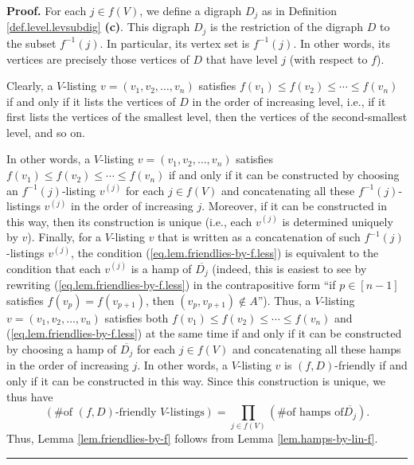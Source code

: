 \documentclass[numbers=enddot,12pt,final,onecolumn,notitlepage]{scrartcl}%
\numberwithin{exer}{section}
\theoremstyle{definition}
\newenvironment{proof}[1][Proof]{\noindent\textbf{#1.} }{\ \rule{0.5em}{0.5em}}
\let\prodnonlimits\prod
\renewcommand{\prod}{\prodnonlimits\limits}
\newenvironment{vershort}{}{}
\begin{document}
\begin{vershort}


\begin{proof}
For each $j\in f\left(  V\right)  $, we define a digraph $D_{j}$ as in
Definition \ref{def.level.levsubdig} \textbf{(c)}. This digraph $D_{j}$ is the
restriction of the digraph $D$ to the subset $f^{-1}\left(  j\right)  $. In
particular, its vertex set is $f^{-1}\left(  j\right)  $. In other words, its
vertices are precisely those vertices of $D$ that have level $j$ (with respect
to $f$).

Clearly, a $V$-listing $v=\left(  v_{1},v_{2},\ldots,v_{n}\right)  $ satisfies
$f\left(  v_{1}\right)  \leq f\left(  v_{2}\right)  \leq\cdots\leq f\left(
v_{n}\right)  $ if and only if it lists the vertices of $D$ in the order of
increasing level, i.e., if it first lists the vertices of the smallest level,
then the vertices of the second-smallest level, and so on.

In other words, a $V$-listing $v=\left(  v_{1},v_{2},\ldots,v_{n}\right)  $
satisfies $f\left(  v_{1}\right)  \leq f\left(  v_{2}\right)  \leq\cdots\leq
f\left(  v_{n}\right)  $ if and only if it can be constructed by choosing an
$f^{-1}\left(  j\right)  $-listing $v^{\left(  j\right)  }$ for each $j\in
f\left(  V\right)  $ and concatenating all these $f^{-1}\left(  j\right)
$-listings $v^{\left(  j\right)  }$ in the order of increasing $j$. Moreover,
if it can be constructed in this way, then its construction is unique (i.e.,
each $v^{\left(  j\right)  }$ is determined uniquely by $v$). Finally, for a
$V$-listing $v$ that is written as a concatenation of such $f^{-1}\left(
j\right)  $-listings $v^{\left(  j\right)  }$, the condition
(\ref{eq.lem.friendlies-by-f.less}) is equivalent to the condition that each
$v^{\left(  j\right)  }$ is a hamp of $\overline{D_{j}}$ (indeed, this is
easiest to see by rewriting (\ref{eq.lem.friendlies-by-f.less}) in the
contrapositive form \textquotedblleft if $p\in\left[  n-1\right]  $ satisfies
$f\left(  v_{p}\right)  =f\left(  v_{p+1}\right)  $, then $\left(
v_{p},v_{p+1}\right)  \notin A$\textquotedblright). Thus, a $V$-listing
$v=\left(  v_{1},v_{2},\ldots,v_{n}\right)  $ satisfies both $f\left(
v_{1}\right)  \leq f\left(  v_{2}\right)  \leq\cdots\leq f\left(
v_{n}\right)  $ and (\ref{eq.lem.friendlies-by-f.less}) at the same time if
and only if it can be constructed by choosing a hamp of $\overline{D_{j}}$ for
each $j\in f\left(  V\right)  $ and concatenating all these hamps in the order
of increasing $j$. In other words, a $V$-listing $v$ is $\left(  f,D\right)
$-friendly if and only if it can be constructed in this way. Since this
construction is unique, we thus have%
\[
\left(  \text{\# of }\left(  f,D\right)  \text{-friendly }V\text{-listings}%
\right)  =\prod_{j\in f\left(  V\right)  }\left(  \text{\# of hamps of
}\overline{D_{j}}\right)  .
\]
Thus, Lemma \ref{lem.friendlies-by-f} follows from Lemma
\ref{lem.hamps-by-lin-f}.
\end{proof}
\end{vershort}
\end{document}
